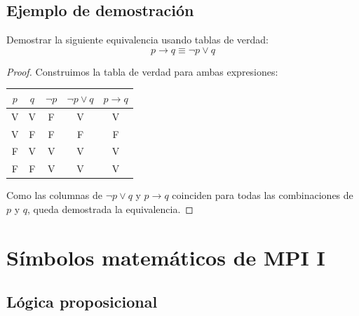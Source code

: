 \subsection{Ejemplo de demostración}

\begin{ejemplo}
Demostrar la siguiente equivalencia usando tablas de verdad:
\[
p \to q \equiv \lnot p \lor q
\]

\begin{proof}
Construimos la tabla de verdad para ambas expresiones:

\begin{center}
\begin{tabular}{c|c|c|c|c}
$p$ & $q$ & $\lnot p$ & $\lnot p \lor q$ & $p \to q$ \\
\midrule
V & V & F & V & V \\
V & F & F & F & F \\
F & V & V & V & V \\
F & F & V & V & V
\end{tabular}
\end{center}

Como las columnas de $\lnot p \lor q$ y $p \to q$ coinciden para
todas las combinaciones de $p$ y $q$, queda demostrada la equivalencia.
\end{proof}
\end{ejemplo}


\section{Símbolos matemáticos de MPI I}

\subsection{Lógica proposicional}

